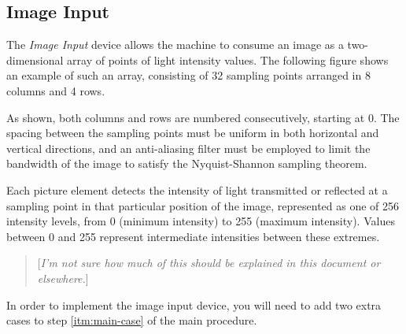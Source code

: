 \documentclass[a4paper,12pt]{article}
\newcommand{\comment}[1]{\begin{quote}[\textit{#1}]\end{quote}}
\begin{document}
\subsection{Image Input}

The \emph{Image Input} device allows the machine to consume an image as a two-dimensional array of points of light intensity values.
The following figure shows an example of such an array, consisting of 32 sampling points arranged in 8 columns and 4 rows.
\begin{center}
\end{center}
As shown, both columns and rows are numbered consecutively, starting at 0.
The spacing between the sampling points must be uniform in both horizontal and vertical directions, and an anti-aliasing filter must be employed to limit the bandwidth of the image to satisfy the Nyquist-Shannon sampling theorem.

Each picture element detects the intensity of light transmitted or reflected at a sampling point in that particular position of the image, represented as one of 256 intensity levels, from 0 (minimum intensity) to 255 (maximum intensity).
Values between 0 and 255 represent intermediate intensities between these extremes.

\comment{I'm not sure how much of this should be explained in this document or elsewhere.}

In order to implement the image input device, you will need to add two extra cases to step \ref{itm:main-case} of the main procedure.
\end{document}
